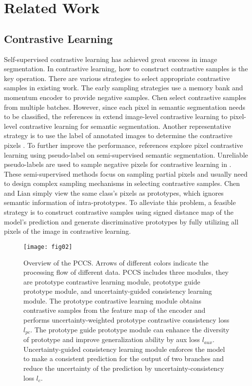 \section{Related Work}
\label{sec:related work}
\subsection{Contrastive Learning}
Self-supervised contrastive learning has achieved great success in image segmentation.  In contrastive learning, how to construct contrastive samples is the key operation. There are various strategies to select appropriate contrastive samples in existing work. The early sampling strategies \cite{contra-Moco1,contra-Moco2} use a memory bank and momentum encoder to provide negative samples. Chen \cite{contra-SimCLR} select contrastive samples from multiple batches. However, since each pixel in semantic segmentation needs to be classified, the references in \cite{contra-explore-cross,contra-label-effient,contra-PC2Seg,contra--gloab-locall,contra-rethink-prototype} extend image-level contrastive learning to pixel-level contrastive learning for semantic segmentation. Another representative strategy is to use the label of annotated images to determine the contrastive pixels \cite{contra-explore-cross}. 
To further improve the performance, references \cite{contra-label-effient,contra-PC2Seg,contra-region-level,LocalCL} explore pixel contrastive learning using pseudo-label on semi-supervised semantic segmentation. Unreliable pseudo-labels are used to sample negative pixels for contrastive learning in \cite{pseudo-contra-U2PL}. These semi-supervised methods focus on sampling partial pixels and usually need to design complex sampling mechanisms in selecting contrastive samples. Chen and Lian \cite{contra-semi-proto} simply view the same class's pixels as prototypes, which ignores semantic information of intra-prototypes. To alleviate this problem, a feasible strategy is to construct contrastive samples using signed distance map of the model's prediction and generate discriminative prototypes by fully utilizing all pixels of the image in contrastive learning.

\begin{figure*}[htbp]
	\centerline{\texttt{[image: fig02]}}
	\caption{Overview of the PCCS. Arrows of different colors indicate the processing flow of different data. PCCS includes three modules, they are prototype contrastive learning module, prototype guide prototype module, and uncertainty-guided consistency learning module. The prototype contrastive learning module obtains contrastive samples from the feature map of the encoder and performs uncertainty-weighted prototype contrastive consistency loss {$l_{pc}$}. The prototype guide prototype module can enhance the diversity of prototype and improve generalization ability by aux loss {$l_{aux}$}. 
		Uncertainty-guided consistency learning module enforces the model to make a consistent prediction for the output of two branches and reduce the uncertainty of the prediction by  uncertainty-consistency loss {$l_{c}$}.}
	\label{fig:main_arch}
\end{figure*}


